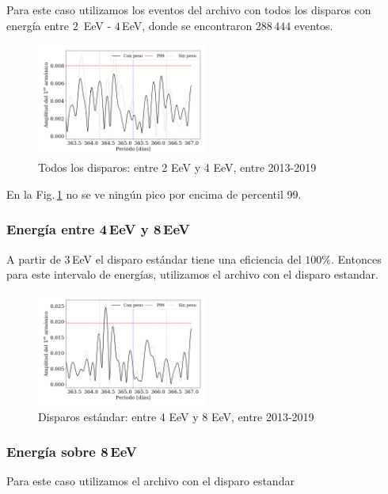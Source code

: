 Para este caso utilizamos los eventos del archivo con todos los disparos con energía entre $2\,$ EeV - $4\,$EeV, donde se encontraron $288\,444$ eventos.
\begin{figure}[H]
	\centering
	\includegraphics[width=0.5\textwidth]{Graficos/2019_AllTriggers_2_4_EeV_con_vs_sin_peso.png}
	\caption{Todos los disparos: entre 2 EeV y 4 EeV, entre 2013-2019}
	\label{fig:24w}
\end{figure}

En la Fig.\,\ref{fig:24w} no se ve ningún pico por encima de  percentil 99.


\subsubsection{Energía entre 4\,EeV y 8\,EeV}

A partir de $3\,$EeV el disparo estándar tiene una eficiencia del $100\%$. Entonces para este  intervalo de energías,  utilizamos el archivo con el disparo estandar.

\begin{figure}[H]
	\centering
	\includegraphics[width=0.5\textwidth]{Graficos/2019_Main_Array_4_8_EeV_con_vs_sin_peso.png}
	\caption{Disparos estándar: entre 4 EeV y 8 EeV, entre 2013-2019}
	\label{fig:48w}
\end{figure}

\subsubsection{Energía sobre 8\,EeV}

Para este caso utilizamos el archivo con el disparo estandar

